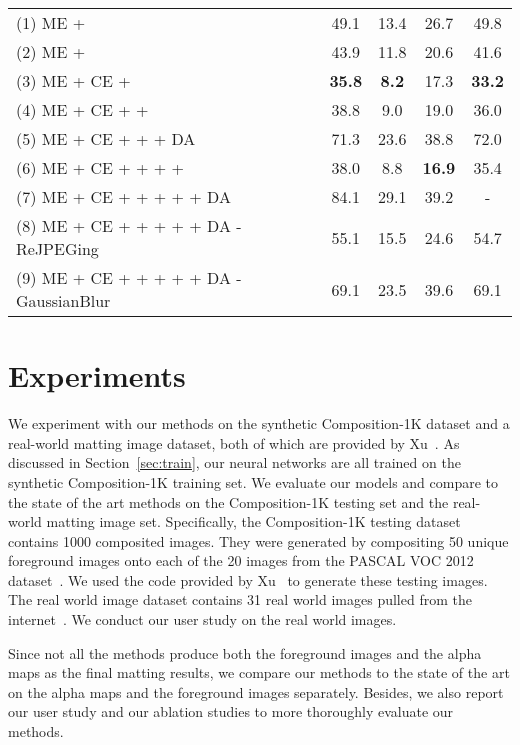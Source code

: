 \documentclass[10pt,twocolumn,letterpaper]{article}
\begin{document}
\begin{table}[t]
\begin{tabular}{lcccc}
			\multicolumn{1}{m{35mm}}{(1) ME + } & 49.1 &13.4 &26.7  &49.8 \\
			\multicolumn{1}{m{35mm}}{(2) ME + } &43.9 &11.8 &20.6 &41.6 \\
			\multicolumn{1}{m{35mm}}{(3) ME + CE + } & \textbf{35.8}  &\textbf{8.2} &17.3  &\textbf{33.2} \\
			\multicolumn{1}{m{35mm}}{(4) ME + CE +  + } & 38.8  &9.0 &19.0 &36.0 \\
			\multicolumn{1}{m{35mm}}{(5) ME + CE +  +  + DA} & 71.3  &23.6 &38.8 &72.0 \\
			\multicolumn{1}{m{35mm}}{(6) ME + CE +  +  +   +  } & 38.0 & 8.8 & \textbf{16.9} & 35.4 \\
			\multicolumn{1}{m{35mm}}{(7) ME + CE +  +  +   +   + DA} & 84.1 & 29.1 & 39.2 & - \\
			\multicolumn{1}{m{35mm}}{(8) ME + CE +  +  +   +   + DA - ReJPEGing} & 55.1 & 15.5 & 24.6 & 54.7 \\
			\multicolumn{1}{m{35mm}}{(9) ME + CE +  +  +   +   + DA - GaussianBlur} & 69.1 & 23.5 & 39.6 & 69.1 \\
			\hline
	\end{tabular}\vspace{-0.2in}
\end{table}


 
\section{Experiments}
\label{sec:exp}
We experiment with our methods on the synthetic Composition-1K dataset and a real-world matting image dataset, both of which are provided by Xu~\etal\cite{xu2017deep}. As discussed in Section~\ref{sec:train}, our neural networks are all trained on the synthetic Composition-1K training set. We evaluate our models and compare to the state of the art methods on the Composition-1K testing set and the real-world matting image set. Specifically, the Composition-1K testing dataset contains 1000 composited images. They were generated by compositing 50 unique foreground images onto each of the 20 images from the PASCAL VOC 2012 dataset~\cite{everingham2010pascal}. We used the code provided by Xu~\etal\cite{xu2017deep} to generate these testing images. The real world image dataset contains 31 real world images pulled from the internet~\cite{xu2017deep}. We conduct our user study on the real world images.  

Since not all the methods produce both the foreground images and the alpha maps as the final matting results, we compare our methods to the state of the art on the alpha maps and the foreground images separately. Besides, we also report our user study and our ablation studies to more thoroughly evaluate our methods.
\end{document}
